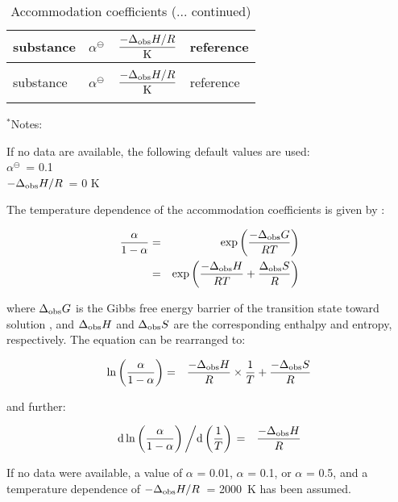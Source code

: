 \documentclass[landscape]{article}
\begin{document}
\clearpage

\begin{longtable}{llrl}
\caption{Accommodation coefficients}\\
\hline
substance & 
$\alpha^{\ominus}$ &
$\displaystyle\frac{-\Delta_{\rm obs}H/R}{\rm K}$ &
reference\\
\hline 
\endfirsthead
\caption{Accommodation coefficients (... continued)}\\
\hline
substance & 
$\alpha^{\ominus}$ &
$\displaystyle\frac{-\Delta_{\rm obs}H/R}{\rm K}$ &
reference\\
\hline 
\endhead
\hline
\endfoot 

\end{longtable}

\begin{multicols}{3}
$^*$Notes:

If no data are available, the following default values are used:\\
$\alpha^{\ominus}$~= 0.1\\
$-\Delta_{\rm obs}H/R$~= 0 K

The temperature dependence of the accommodation coefficients is given by
\citep{155}:

\begin{eqnarray*}
  \frac{\alpha}{1-\alpha} & = & \exp \left( \frac{-\Delta_{\rm obs}G}{RT}
  \right)\\
  & = & \exp \left( \frac{-\Delta_{\rm obs}H}{RT} + \frac{\Delta_{\rm
  obs}S}{R} \right)
\end{eqnarray*}

where $\Delta_{\rm obs}G$ is the Gibbs free energy barrier of the
transition state toward solution \citep{155}, and $\Delta_{\rm obs}H$
and $\Delta_{\rm obs}S$ are the corresponding enthalpy and entropy,
respectively. The equation can be rearranged to:

\begin{eqnarray*}
  \ln\left( \frac{\alpha}{1-\alpha} \right) & = & 
  \frac{-\Delta_{\rm obs}H}{R} \times \frac{1}{T} + \frac{-\Delta_{\rm
  obs}S}{R}\\
\end{eqnarray*}

and further:

\begin{eqnarray*}
  {\mathrm{d}}\ln\left( \frac{\alpha}{1-\alpha} \right) \left/ {\mathrm{d}}\left(
    \frac{1}{T} \right)\right. & = & \frac{-\Delta_{\rm obs}H}{R}
\end{eqnarray*}

If no data were available, a value of $\alpha$ = 0.01, $\alpha$ = 0.1,
or $\alpha$ = 0.5, and a temperature dependence of $-\Delta_{\rm
  obs}H/R$~= 2000~\unit{K} has been assumed.


\end{multicols}
\end{document}
